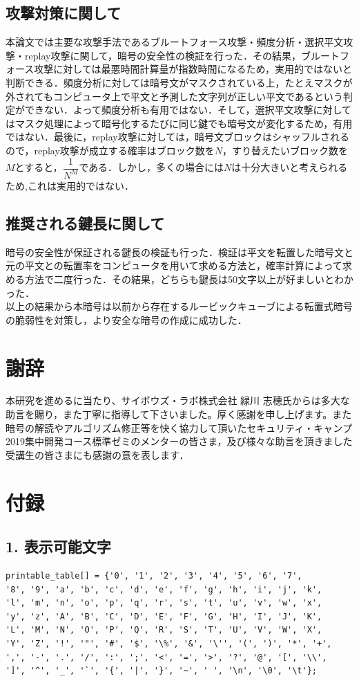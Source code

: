 \documentclass[titlepage]{jarticle}
\begin{document}
\subsection{攻撃対策に関して}
本論文では主要な攻撃手法であるブルートフォース攻撃・頻度分析・選択平文攻撃・replay攻撃に関して，暗号の安全性の検証を行った．その結果，ブルートフォース攻撃に対しては最悪時間計算量が指数時間になるため，実用的ではないと判断できる．頻度分析に対しては暗号文がマスクされている上，たとえマスクが外されてもコンピュータ上で平文と予測した文字列が正しい平文であるという判定ができない．よって頻度分析も有用ではない．そして，選択平文攻撃に対してはマスク処理によって暗号化するたびに同じ鍵でも暗号文が変化するため，有用ではない．最後に，replay攻撃に対しては，暗号文ブロックはシャッフルされるので，replay攻撃が成立する確率はブロック数を\(N\)，すり替えたいブロック数を\(M\)とすると，\(\dfrac{1}{N^M}\)である．しかし，多くの場合には\(N\)は十分大きいと考えられるため,これは実用的ではない．

\subsection{推奨される鍵長に関して}
暗号の安全性が保証される鍵長の検証も行った．検証は平文を転置した暗号文と元の平文との転置率をコンピュータを用いて求める方法と，確率計算によって求める方法で二度行った．その結果，どちらも鍵長は50文字以上が好ましいとわかった．\\

以上の結果から本暗号は以前から存在するルービックキューブによる転置式暗号の脆弱性を対策し，より安全な暗号の作成に成功した．

\section{謝辞}
本研究を進めるに当たり、サイボウズ・ラボ株式会社 緑川 志穂氏からは多大な助言を賜り，また丁寧に指導して下さいました。厚く感謝を申し上げます。また暗号の解読やアルゴリズム修正等を快く協力して頂いたセキュリティ・キャンプ2019集中開発コース標準ゼミのメンターの皆さま，及び様々な助言を頂きました受講生の皆さまにも感謝の意を表します．

\section{付録}
\subsection{1. 表示可能文字}
\begin{verbatim}
printable_table[] = {'0', '1', '2', '3', '4', '5', '6', '7', 
'8', '9', 'a', 'b', 'c', 'd', 'e', 'f', 'g', 'h', 'i', 'j', 'k', 
'l', 'm', 'n', 'o', 'p', 'q', 'r', 's', 't', 'u', 'v', 'w', 'x', 
'y', 'z', 'A', 'B', 'C', 'D', 'E', 'F', 'G', 'H', 'I', 'J', 'K', 
'L', 'M', 'N', 'O', 'P', 'Q', 'R', 'S', 'T', 'U', 'V', 'W', 'X', 
'Y', 'Z', '!', '"', '#', '$', '\%', '&', '\'', '(', ')', '*', '+', 
',', '-', '.', '/', ':', ';', '<', '=', '>', '?', '@', '[', '\\', 
']', '^', '_', '`', '{', '|', '}', '~', ' ', '\n', '\0', '\t'};
\end{verbatim}
\end{document}
